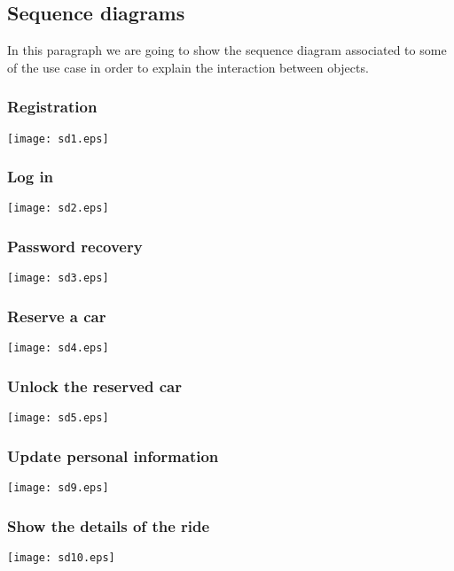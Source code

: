 \pagebreak
\subsection{Sequence diagrams}
In this paragraph we are going to show the sequence diagram associated to some of the use case in order to explain the interaction between objects.

\subsubsection{Registration}
	\centerline{
		\texttt{[image: sd1.eps]}}
	\pagebreak

\subsubsection{Log in}
	\centerline{
		\texttt{[image: sd2.eps]}}
	\pagebreak

\subsubsection{Password recovery}
	\centerline{
		\texttt{[image: sd3.eps]}}
	\pagebreak
	
\subsubsection{Reserve a car}
	\centerline{
		\texttt{[image: sd4.eps]}}
	\pagebreak
	
\subsubsection{Unlock the reserved car}
	\centerline{
		\texttt{[image: sd5.eps]}}
		\pagebreak

\subsubsection{Update personal information}
	\centerline{
		\texttt{[image: sd9.eps]}}
	\pagebreak
	
\subsubsection{Show the details of the ride}
	\centerline{
		\texttt{[image: sd10.eps]}}